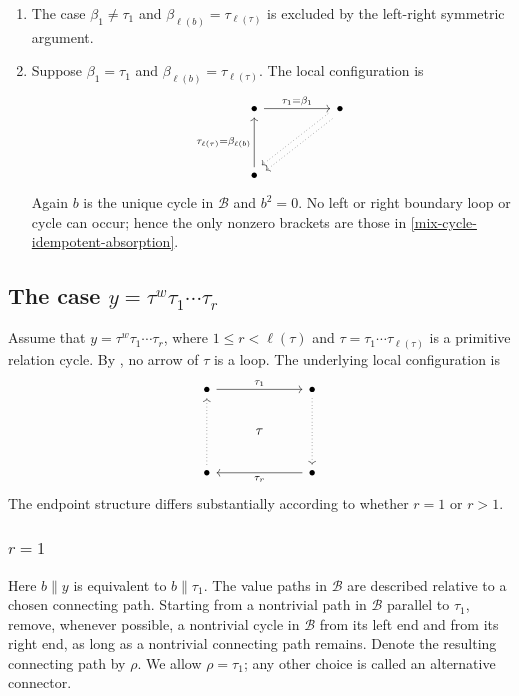 \documentclass[11pt,a4paper,reqno]{amsart}
\newcommand{\mB}{\mathcal B}
\newcommand{\taue}{\tau_{\ell(\tau)}}
\newcommand{\bet}{\beta_{\ell(b)}}
\theoremstyle{plain}
\theoremstyle{definition}
\numberwithin{equation}{section}
\begin{document}
\begin{enumerate}
		\item The case $\beta_1\neq\tau_1$ and $\bet=\taue$ is excluded by the
		left-right symmetric argument.
		
		\item Suppose $\beta_1=\tau_1$ and $\bet=\taue$.  The local configuration
		is
		\[
		\begin{tikzcd}
			\bullet && \bullet \\
			\\
			\bullet
			\arrow["{\tau_1=\beta_1}", from=1-1, to=1-3]
			\arrow[shift right, dotted, from=1-3, to=3-1]
			\arrow[shift left, dotted, from=1-3, to=3-1]
			\arrow["{\taue=\bet}", from=3-1, to=1-1]
		\end{tikzcd}
		\]
		Again $b$ is the unique cycle in $\mB$ and $b^2=0$.  No left or right
		boundary loop or cycle can occur; hence the only nonzero brackets are those in
		\eqref{mix-cycle-idempotent-absorption}.
	\end{enumerate}
	\subsection{The case \texorpdfstring{$y=\tau^w\tau_1\cdots\tau_r$}{y = tau power w with suffix}}\label{subsec:mixed-suffix-powers}
	
	Assume that
	$y=\tau^w\tau_1\cdots\tau_r$, where $1\le r<\ell(\tau)$ and
	$\tau=\tau_1\cdots\taue$ is a primitive relation cycle.  By
	, no arrow of $\tau$ is a loop.  The underlying local
	configuration is
	\[
	\begin{tikzcd}
		\bullet && \bullet \\
		& \tau \\
		\bullet && \bullet
		\arrow["{\tau_1}", from=1-1, to=1-3]
		\arrow[dotted, from=1-3, to=3-3]
		\arrow[dotted, from=3-1, to=1-1]
		\arrow["{\tau_r}", from=3-3, to=3-1]
	\end{tikzcd}
	\]
	The endpoint structure differs substantially according to whether $r=1$ or
	$r>1$.
	
	\subsubsection{$r=1$}
	
	Here $b\parallel y$ is equivalent to $b\parallel\tau_1$.
	The value paths in $\mB$ are described relative to a chosen
	connecting path. 
	Starting from a nontrivial path in $\mB$ parallel to $\tau_1$, remove, whenever possible,
	a nontrivial cycle in $\mB$ from its left end and from its right end, as long as a
	nontrivial connecting path remains.  Denote the resulting connecting path by
	$\rho$.  We allow $\rho=\tau_1$; any other choice is called an alternative
	connector.
	
\end{document}
